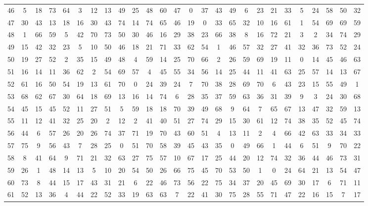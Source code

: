 \begin{table}
\begin{tabular}{c c c c c c c c c c c c c c c c c c c c c c c c c c }
46 & 5 & 18 & 73 & 64 & 3 & 12 & 13 & 49 & 25 & 48 & 60 & 47 & 0 & 37 & 43 & 49 & 6 & 23 & 21 & 33 & 5 & 24 & 58 & 50 & 32 \\
47 & 30 & 43 & 13 & 18 & 16 & 30 & 43 & 74 & 14 & 74 & 65 & 46 & 19 & 0 & 33 & 65 & 32 & 10 & 16 & 61 & 1 & 54 & 69 & 69 & 59 \\
48 & 1 & 66 & 59 & 5 & 42 & 70 & 73 & 50 & 30 & 46 & 16 & 29 & 38 & 23 & 66 & 38 & 8 & 16 & 72 & 21 & 3 & 2 & 34 & 74 & 29 \\
49 & 15 & 42 & 32 & 23 & 5 & 10 & 50 & 46 & 18 & 21 & 71 & 33 & 62 & 54 & 1 & 46 & 57 & 32 & 27 & 41 & 32 & 36 & 73 & 52 & 24 \\
50 & 19 & 27 & 52 & 2 & 35 & 15 & 49 & 48 & 4 & 59 & 14 & 25 & 70 & 66 & 2 & 26 & 59 & 69 & 19 & 11 & 0 & 14 & 45 & 46 & 63 \\
51 & 16 & 14 & 11 & 36 & 62 & 2 & 54 & 69 & 57 & 4 & 45 & 55 & 34 & 56 & 14 & 25 & 44 & 11 & 41 & 63 & 25 & 57 & 14 & 13 & 67 \\
52 & 61 & 16 & 50 & 54 & 19 & 13 & 61 & 70 & 0 & 24 & 39 & 24 & 7 & 70 & 38 & 28 & 69 & 70 & 6 & 43 & 23 & 15 & 55 & 49 & 1 \\
53 & 68 & 62 & 67 & 30 & 64 & 18 & 69 & 13 & 16 & 14 & 74 & 6 & 28 & 35 & 37 & 59 & 63 & 36 & 31 & 39 & 9 & 3 & 24 & 30 & 68 \\
54 & 45 & 15 & 45 & 52 & 11 & 27 & 51 & 5 & 59 & 18 & 18 & 70 & 39 & 49 & 68 & 9 & 64 & 7 & 65 & 67 & 13 & 47 & 32 & 59 & 13 \\
55 & 11 & 12 & 41 & 32 & 25 & 20 & 2 & 12 & 2 & 41 & 40 & 51 & 27 & 74 & 29 & 15 & 30 & 61 & 12 & 74 & 38 & 35 & 52 & 45 & 74 \\
56 & 44 & 6 & 57 & 26 & 20 & 26 & 74 & 37 & 71 & 19 & 70 & 43 & 60 & 51 & 4 & 13 & 11 & 2 & 4 & 66 & 42 & 63 & 33 & 34 & 33 \\
57 & 75 & 9 & 56 & 43 & 7 & 28 & 25 & 0 & 51 & 70 & 58 & 39 & 45 & 43 & 35 & 0 & 49 & 66 & 1 & 44 & 6 & 51 & 9 & 70 & 22 \\
58 & 8 & 41 & 64 & 9 & 71 & 21 & 32 & 63 & 27 & 75 & 57 & 10 & 67 & 17 & 25 & 44 & 20 & 12 & 74 & 32 & 36 & 44 & 46 & 73 & 31 \\
59 & 26 & 1 & 48 & 14 & 13 & 5 & 10 & 20 & 54 & 50 & 26 & 66 & 75 & 45 & 70 & 53 & 50 & 1 & 0 & 24 & 64 & 21 & 13 & 54 & 47 \\
60 & 73 & 8 & 44 & 15 & 17 & 43 & 31 & 21 & 6 & 22 & 46 & 73 & 56 & 22 & 75 & 34 & 37 & 20 & 45 & 69 & 30 & 17 & 6 & 71 & 11 \\
61 & 52 & 13 & 36 & 4 & 44 & 22 & 52 & 33 & 19 & 63 & 63 & 7 & 22 & 41 & 30 & 75 & 28 & 55 & 71 & 47 & 22 & 16 & 15 & 7 & 17 \\

\end{tabular}
\end{table}
